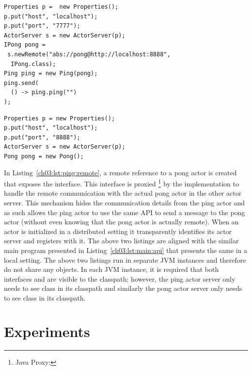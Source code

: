 \begin{center}
\begin{minipage}[t]{0.48\textwidth}
\begin{lstlisting}[caption=Remote ping actor main,label=ch03:lst:ping:remote]
Properties p =  new Properties();
p.put("host", "localhost");
p.put("port", "7777");
ActorServer s = new ActorServer(p);
IPong pong = 
 s.newRemote("abs://pong@http://localhost:8888",
  IPong.class);
Ping ping = new Ping(pong);
ping.send(
  () -> ping.ping("")
);
\end{lstlisting}
\end{minipage}
\hfill
\begin{minipage}[t]{0.48\textwidth}
\begin{lstlisting}[caption=Remote pong actor main,label=ch03:lst:pong:remote]
Properties p = new Properties();
p.put("host", "localhost");
p.put("port", "8888");
ActorServer s = new ActorServer(p);
Pong pong = new Pong();
\end{lstlisting}
\end{minipage}
\end{center}

In Listing~\ref{ch03:lst:ping:remote}, a remote reference to a pong actor is created that exposes the  interface.
This interface is proxied
\footnote{Java Proxy: } by the implementation 
to handle the remote communication with the actual pong actor in the other actor server.
This mechanism hides the communication details from the ping actor and as such allows the ping actor to use 
the same API to send a message to the pong actor (without even  knowing that the pong actor is actually remote).
When an actor is initialized in a distributed setting it transparently identifies its actor server and registers with it.
The above two listings are aligned with the similar main program presented in Listing~\ref{ch03:lst:main:api} that presents the same in a local setting.
The above two listings run in separate JVM instances and therefore do not share any objects.
In each JVM instance, it is required that both interfaces  and  are visible to the classpath; however, 
the ping actor server only needs to see  class in its classpath and similarly the pong actor server only needs 
to see  class in its classpath.

\section{Experiments}
\label{ch03:sec:experiments}

